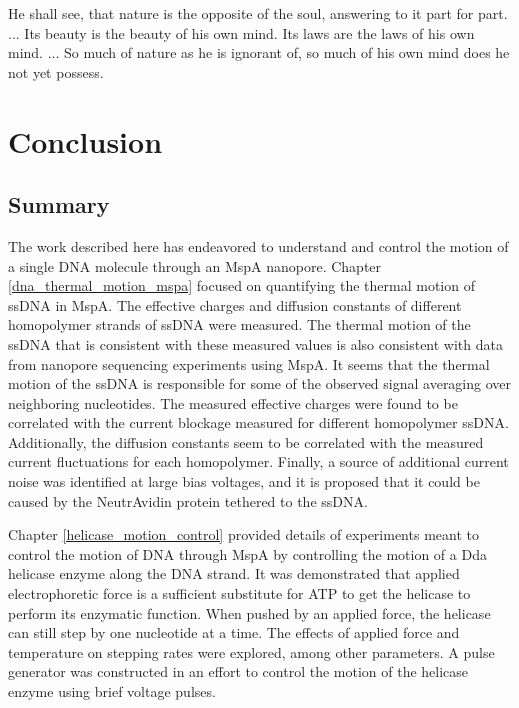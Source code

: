 \begin{savequote}[75mm]
He shall see, that nature is the opposite of the soul, answering to it part for part. ... Its beauty is the beauty of his own mind. Its laws are the laws of his own mind. ... So much of nature as he is ignorant of, so much of his own mind does he not yet possess.
\end{savequote}

\chapter{Conclusion}
\label{conclusion}

\section{Summary}

The work described here has endeavored to understand and control the motion of a single DNA molecule through an MspA nanopore.  Chapter \ref{dna_thermal_motion_mspa} focused on quantifying the thermal motion of ssDNA in MspA.  The effective charges and diffusion constants of different homopolymer strands of ssDNA were measured.  The thermal motion of the ssDNA that is consistent with these measured values is also consistent with data from nanopore sequencing experiments using MspA.  It seems that the thermal motion of the ssDNA is responsible for some of the observed signal averaging over neighboring nucleotides.  The measured effective charges were found to be correlated with the current blockage measured for different homopolymer ssDNA.  Additionally, the diffusion constants seem to be correlated with the measured current fluctuations for each homopolymer.  Finally, a source of additional current noise was identified at large bias voltages, and it is proposed that it could be caused by the NeutrAvidin protein tethered to the ssDNA.

Chapter \ref{helicase_motion_control} provided details of experiments meant to control the motion of DNA through MspA by controlling the motion of a Dda helicase enzyme along the DNA strand.  It was demonstrated that applied electrophoretic force is a sufficient substitute for ATP to get the helicase to perform its enzymatic function.  When pushed by an applied force, the helicase can still step by one nucleotide at a time.  The effects of applied force and temperature on stepping rates were explored, among other parameters.  A pulse generator was constructed in an effort to control the motion of the helicase enzyme using brief voltage pulses.

